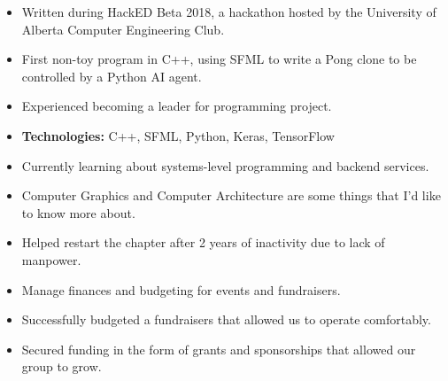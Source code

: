 \documentclass[10pt,a4paper,ragged2e,academicons]{altacv}
\begin{document}
\begin{paracol}{2}
  \begin{itemize}
    \item Written during HackED Beta 2018, a hackathon hosted by the University of Alberta Computer Engineering Club.
    \item First non-toy program in C++, using SFML to write a Pong clone to be controlled by a Python AI agent.
    \item Experienced becoming a leader for programming project.
    \item \textbf{Technologies:} C++, SFML, Python, Keras, TensorFlow
  \end{itemize}
  \divider\small

  \nocite{*}

  \switchcolumn



  \cvtag{\LaTeX}



  \begin{itemize}
    \item Currently learning about systems-level programming and backend services.
    \item Computer Graphics and Computer \newline Architecture are some things that I'd like to know more about.
  \end{itemize}


  \begin{itemize}
    \item Helped restart the chapter after 2 years of inactivity due to lack of manpower.
    \item Manage finances and budgeting for events and fundraisers.
    \item Successfully budgeted a fundraisers that allowed us to operate comfortably.
    \item Secured funding in the form of grants and sponsorships that allowed our group to grow.
  \end{itemize}
  \divider\small


\end{paracol}
\end{document}
